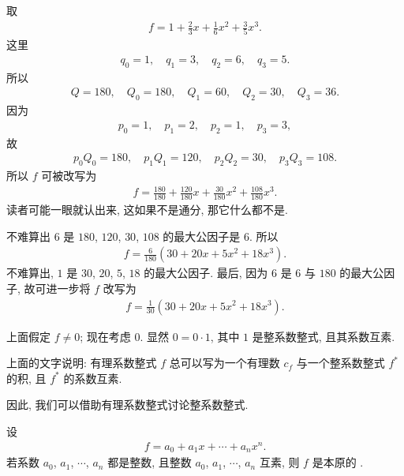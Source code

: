 \begin{example}
    取
    \begin{align*}
        f = 1 + \frac{2}{3} x + \frac{1}{6}x^2 + \frac{3}{5}x^3.
    \end{align*}
    这里
    \begin{align*}
        q_0 = 1, \quad q_1 = 3, \quad q_2 = 6, \quad q_3 = 5.
    \end{align*}
    所以
    \begin{align*}
        Q = 180, \quad Q_0 = 180, \quad Q_1 = 60, \quad Q_2 = 30, \quad Q_3 = 36.
    \end{align*}
    因为
    \begin{align*}
        p_0 = 1, \quad p_1 = 2, \quad p_2 = 1, \quad p_3 = 3,
    \end{align*}
    故
    \begin{align*}
        p_0 Q_0 = 180, \quad p_1 Q_1 = 120, \quad p_2 Q_2 = 30, \quad p_3 Q_3 = 108.
    \end{align*}
    所以 $f$ 可被改写为
    \begin{align*}
        f = \frac{180}{180} + \frac{120}{180} x + \frac{30}{180} x^2 + \frac{108}{180} x^3.
    \end{align*}
    读者可能一眼就认出来, 这如果不是通分, 那它什么都不是.

    不难算出 $6$ 是 $180$, $120$, $30$, $108$ 的最大公因子是 $6$. 所以
    \begin{align*}
        f = \frac{6}{180} (30 + 20x + 5x^2 + 18x^3).
    \end{align*}
    不难算出, $1$ 是 $30$, $20$, $5$, $18$ 的最大公因子. 最后, 因为 $6$ 是 $6$ 与 $180$ 的最大公因子, 故可进一步将 $f$ 改写为
    \begin{align*}
        f = \frac{1}{30} (30 + 20x + 5x^2 + 18x^3).
    \end{align*}
\end{example}

上面假定 $f \neq 0$; 现在考虑 $0$. 显然 $0 = 0 \cdot 1$, 其中 $1$ 是整系数整式, 且其系数互素.

上面的文字说明: 有理系数整式 $f$ 总可以写为一个有理数 $c_f$ 与一个整系数整式 $f^{\ast}$ 的积, 且 $f^{\ast}$ 的系数互素.

因此, 我们可以借助有理系数整式讨论整系数整式.

\begin{definition}
    设
    \begin{align*}
        f = a_0 + a_1 x + \cdots + a_n x^n.
    \end{align*}
    若系数 $a_0$, $a_1$, $\cdots$, $a_n$ 都是整数, 且整数 $a_0$, $a_1$, $\cdots$, $a_n$ 互素, 则 $f$ 是本原的 .
\end{definition}

